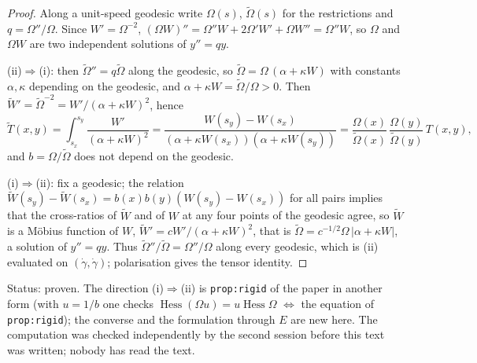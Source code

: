 \documentclass[a4paper,11pt]{article}
\theoremstyle{definition}
\theoremstyle{remark}
\newcommand{\status}[1]{\par\noindent\textsf{\small Status: #1}\par}
\begin{document}
\begin{proof}
Along a unit-speed geodesic write $\Omega(s)$, $\tilde\Omega(s)$ for the restrictions and $q=\Omega''/\Omega$. Since $W'=\Omega^{-2}$, $(\Omega W)''=\Omega''W+2\Omega'W'+\Omega W''=\Omega''W$, so $\Omega$ and $\Omega W$ are two independent solutions of $y''=qy$.

(ii)$\Rightarrow$(i): then $\tilde\Omega''=q\tilde\Omega$ along the geodesic, so $\tilde\Omega=\Omega\,(\alpha+\kappa W)$ with constants $\alpha,\kappa$ depending on the geodesic, and $\alpha+\kappa W=\tilde\Omega/\Omega>0$. Then $\tilde W'=\tilde\Omega^{-2}=W'/(\alpha+\kappa W)^2$, hence
\[
\tilde T(x,y)=\int_{s_x}^{s_y}\frac{W'}{(\alpha+\kappa W)^2}=\frac{W(s_y)-W(s_x)}{(\alpha+\kappa W(s_x))(\alpha+\kappa W(s_y))}=\frac{\Omega(x)}{\tilde\Omega(x)}\,\frac{\Omega(y)}{\tilde\Omega(y)}\,T(x,y),
\]
and $b=\Omega/\tilde\Omega$ does not depend on the geodesic.

(i)$\Rightarrow$(ii): fix a geodesic; the relation $\tilde W(s_y)-\tilde W(s_x)=b(x)b(y)(W(s_y)-W(s_x))$ for all pairs implies that the cross-ratios of $\tilde W$ and of $W$ at any four points of the geodesic agree, so $\tilde W$ is a M\"obius function of $W$, $\tilde W'=cW'/(\alpha+\kappa W)^2$, that is $\tilde\Omega=c^{-1/2}\Omega\,|\alpha+\kappa W|$, a solution of $y''=qy$. Thus $\tilde\Omega''/\tilde\Omega=\Omega''/\Omega$ along every geodesic, which is (ii) evaluated on $(\dot\gamma,\dot\gamma)$; polarisation gives the tensor identity.
\end{proof}
\status{proven. The direction (i)$\Rightarrow$(ii) is \texttt{prop:rigid} of the paper in another form (with $u=1/b$ one checks $\operatorname{Hess}(\Omega u)=u\operatorname{Hess}\Omega$ $\Leftrightarrow$ the equation of \texttt{prop:rigid}); the converse and the formulation through $E$ are new here. The computation was checked independently by the second session before this text was written; nobody has read the text.}
\end{document}
